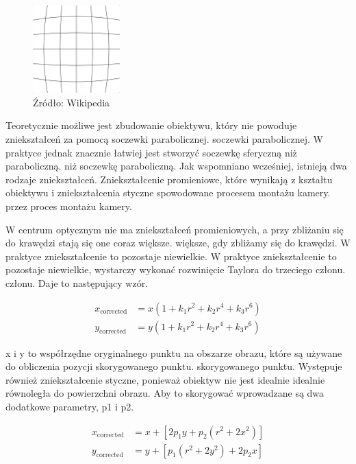 \documentclass[magisterska]{pracadypl}
\begin{document}
\begin{figure}[h]  %
    \centering  %
    \includegraphics[width=0.3\textwidth]{images/barrel.png}  %
    \captionsetup{labelformat=empty, font=footnotesize}
    \caption{Źródło: Wikipedia}
    \label{fig:rpi}  %
\end{figure}

Teoretycznie możliwe jest zbudowanie obiektywu, który nie powoduje zniekształceń za pomocą soczewki parabolicznej.
soczewki parabolicznej. W praktyce jednak znacznie łatwiej jest stworzyć soczewkę sferyczną niż paraboliczną.
niż soczewkę paraboliczną. Jak wspomniano wcześniej, istnieją dwa rodzaje zniekształceń. Zniekształcenie
promieniowe, które wynikają z kształtu obiektywu i zniekształcenia styczne spowodowane procesem montażu kamery.
przez proces montażu kamery.

W centrum optycznym nie ma zniekształceń promieniowych, a przy zbliżaniu się do krawędzi stają się one coraz większe.
większe, gdy zbliżamy się do krawędzi. W praktyce zniekształcenie to pozostaje niewielkie.
W praktyce zniekształcenie to pozostaje niewielkie, wystarczy wykonać rozwinięcie Taylora do trzeciego członu.
członu. Daje to następujący wzór.

\begin{align*}
x_{\text{corrected}} &= x \left(1 + k_1 r^2 + k_2 r^4 + k_3 r^6 \right) \\
y_{\text{corrected}} &= y \left(1 + k_1 r^2 + k_2 r^4 + k_3 r^6 \right)
\end{align*}

x i y to współrzędne oryginalnego punktu na obszarze obrazu, które są używane do obliczenia pozycji skorygowanego punktu.
skorygowanego punktu.
Występuje również zniekształcenie styczne, ponieważ obiektyw nie jest idealnie
idealnie równoległa do powierzchni obrazu. Aby to skorygować
wprowadzane są dwa dodatkowe parametry, p1 i p2.

\begin{align*}
x_{\text{corrected}} &= x + \left[2p_1 y + p_2 (r^2 + 2x^2)\right] \\
y_{\text{corrected}} &= y + \left[p_1 (r^2 + 2y^2) + 2p_2 x\right]
\end{align*}
\end{document}
